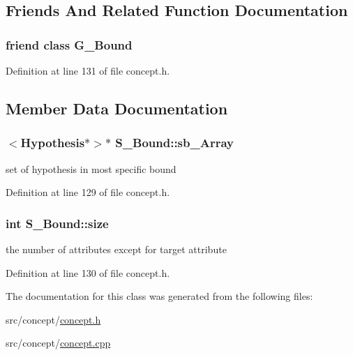\subsection{Friends And Related Function Documentation}
\hypertarget{class_s___bound_ada6e422609483cdffa32ad88125d9f0d}{
\subsubsection[{G\-\_\-\-Bound}]{\setlength{\rightskip}{0pt plus 5cm}friend class {\bf G\-\_\-\-Bound}\hspace{0.3cm}{\ttfamily [friend]}}}\label{class_s___bound_ada6e422609483cdffa32ad88125d9f0d}


Definition at line 131 of file concept.\-h.



\subsection{Member Data Documentation}
\hypertarget{class_s___bound_a2fa303e4f1e4c2df793e1474f0aa6481}{
\subsubsection[{sb\-\_\-\-Array}]{$<${\bf Hypothesis}$\ast$$>$$\ast$ S\-\_\-\-Bound\-::sb\-\_\-\-Array\hspace{0.3cm}{\ttfamily [private]}}}\label{class_s___bound_a2fa303e4f1e4c2df793e1474f0aa6481}


set of hypothesis in most specific bound 



Definition at line 129 of file concept.\-h.

\hypertarget{class_s___bound_a9742961078971270b164bb793b64ee06}{
\subsubsection[{size}]{\setlength{\rightskip}{0pt plus 5cm}int S\-\_\-\-Bound\-::size\hspace{0.3cm}{\ttfamily [private]}}}\label{class_s___bound_a9742961078971270b164bb793b64ee06}


the number of attributes except for target attribute 



Definition at line 130 of file concept.\-h.



The documentation for this class was generated from the following files\-:\begin{DoxyCompactItemize}
\item 
src/concept/\hyperlink{concept_8h}{concept.\-h}\item 
src/concept/\hyperlink{concept_8cpp}{concept.\-cpp}\end{DoxyCompactItemize}
